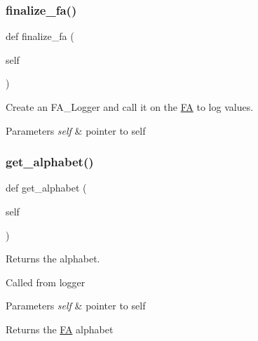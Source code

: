 \subsubsection{\texorpdfstring{finalize\+\_\+fa()}{finalize\_fa()}}
{\footnotesize\ttfamily def finalize\+\_\+fa (\begin{DoxyParamCaption}\item[{}]{self }\end{DoxyParamCaption})}



Create an F\+A\+\_\+\+Logger and call it on the \mbox{\hyperlink{classfinite__automaton_1_1_f_a}{FA}} to log values. 


\begin{DoxyParams}{Parameters}
{\em self} & pointer to self \\
\hline
\end{DoxyParams}
\mbox{\label{classfinite__automaton_1_1_f_a_a8e18faca5cb09062bcef65e75ab2ba29}} 
\subsubsection{\texorpdfstring{get\+\_\+alphabet()}{get\_alphabet()}}
{\footnotesize\ttfamily def get\+\_\+alphabet (\begin{DoxyParamCaption}\item[{}]{self }\end{DoxyParamCaption})}



Returns the alphabet. 

Called from logger 
\begin{DoxyParams}{Parameters}
{\em self} & pointer to self \\
\hline
\end{DoxyParams}
\begin{DoxyReturn}{Returns}
the \mbox{\hyperlink{classfinite__automaton_1_1_f_a}{FA}} alphabet 
\end{DoxyReturn}
\mbox{\label{classfinite__automaton_1_1_f_a_a50297a5bd3019015c230357f0e48e7d8}} 
